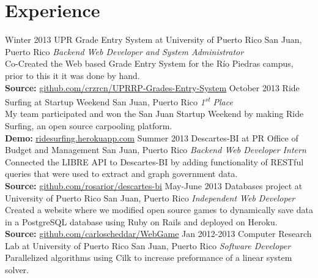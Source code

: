 \documentclass[print]{friggeri-cv} %
\begin{document}

\section{Experience}

\begin{entrylist}
\entry
{\footnotesize Winter 2013}
{UPR Grade Entry System at University of Puerto Rico}
{San Juan, Puerto Rico}
{\small \emph{Backend Web Developer and System Administrator} \\
\small Co-Created the Web based Grade Entry System for the Río Piedras campus, prior to this it
it was done by hand. \\
\small {\bf Source:} \href{https://github.com/crzrcn/UPRRP-Grades-Entry-System}{github.com/crzrcn/UPRRP-Grades-Entry-System}}
\entry
{\footnotesize October 2013}
{Ride Surfing at Startup Weekend}
{San Juan, Puerto Rico}
{\small \emph{1\textsuperscript{st} Place} \\
\small My team participated and won the San Juan Startup Weekend by making Ride Surfing, an open source
carpooling platform. \\
\small {\bf Demo:} \href{http://ridesurfing.herokuapp.com/}{ridesurfing.herokuapp.com}}
\entry
{\footnotesize Summer 2013}
{Descartes-BI at PR Office of Budget and Management}
{San Juan, Puerto Rico}
{\small \emph{Backend Web Developer Intern} \\
\small Connected the LIBRE API to Descartes-BI by adding functionality of RESTful queries that were used to extract and graph government data.\\
\small {\bf Source:} \href{https://github.com/rosarior/descartes-bi}{github.com/rosarior/descartes-bi}}
\entry
{\footnotesize May-June 2013}
{Databases project at University of Puerto Rico}
{San Juan, Puerto Rico}
{\small \emph{Independent Web Developer} \\
\small Created a website where we modified open source games to dynamically save
data in a PostgreSQL database using Ruby on Rails and deployed on Heroku. \\
\small {\bf Source:} \href{https://github.com/carloscheddar/WebGame}{github.com/carloscheddar/WebGame}}
\entry
{\footnotesize Jan 2012-2013}
{Computer Research Lab at University of Puerto Rico}
{San Juan, Puerto Rico}
{\small \emph{Software Developer} \\
\small Parallelized algorithms using Cilk to increase preformance of a linear system solver.}\\
\end{entrylist}
\end{document}
